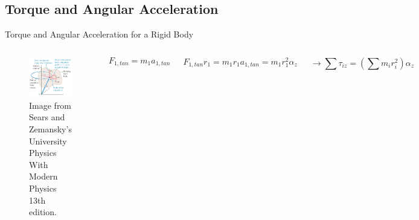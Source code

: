 \documentclass[]{beamer}
\begin{document}

\subsection{Torque and Angular Acceleration}


  \begin{frame}

  Torque and Angular Acceleration for a Rigid Body

    
    \vspace{7mm}



    \begin{columns}[c]
      \column{2in}  %
     
       
    \begin{figure}[h!]  
      \includegraphics[width=1.3\textwidth]{images/5.jpg}
      \caption{Image from Sears and Zemansky's University Physics With 
      Modern Physics 13th edition. }
    
    \end{figure}

      \column{2in}

\begin{equation*}
  F_{1,tan}=m_1 a_{1,tan}
\end{equation*}

\begin{equation*}
  F_{1,tan}r_1=m_1 r_1 a_{1,tan}=m_1 r^2_1 \alpha_{z}
\end{equation*}

\begin{equation*}
 \rightarrow \sum \tau_{iz}=\left( \sum m_i r^2_i    \right)\alpha_{z}
\end{equation*}
   

      \end{columns}

      


\end{frame}
     
\end{document}
